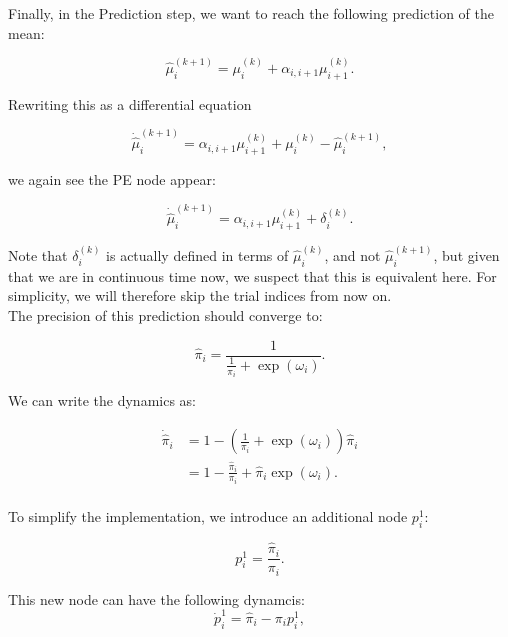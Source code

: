 Finally, in the \textsf{Prediction} step, we want to reach the following prediction of the mean:

\begin{equation}
	\hat{\mu}_i^{(k+1)} = \mu_i^{(k)} + \alpha_{i,i+1} \mu_{i+1}^{(k)}.
\end{equation}

Rewriting this as a differential equation

\begin{equation}
	\dot{\hat{\mu}}_i^{(k+1)} = \alpha_{i,i+1} \mu_{i+1}^{(k)} + \mu_i^{(k)} - \hat{\mu}_i^{(k+1)}, 
\end{equation}

we again see the \textsf{PE} node appear:

\begin{equation}
	\dot{\hat{\mu}}_i^{(k+1)} = \alpha_{i,i+1} \mu_{i+1}^{(k)} + \delta_i^{(k)}. 
\end{equation}

Note that $\delta_i^{(k)}$ is actually defined in terms of $\hat{\mu}_i^{(k)}$, and not $\hat{\mu}_i^{(k+1)}$, but given that we are in continuous time now, we suspect that this is equivalent here. For simplicity, we will therefore skip the trial indices from now on. \\

The precision of this prediction should converge to:

\begin{equation}
	\hat{\pi}_i = \frac{1}{\frac{1}{\pi_i} + \exp(\omega_i)}.
\end{equation}

We can write the dynamics as:

\begin{equation}
	\begin{split}
		\dot{\hat{\pi}}_i &= 1 - (\frac{1}{\pi_i} + \exp(\omega_i)) \hat{\pi}_i\\
		&= 1 - \frac{\hat{\pi}_i}{\pi_i} + \hat{\pi}_i \exp(\omega_i).\\
	\end{split}
\end{equation}

To simplify the implementation, we introduce an additional node $p_i^1$:

\begin{equation}
	p_i^1 = \frac{\hat{\pi}_i}{\pi_i}.
\end{equation}

This new node can have the following dynamcis:
\begin{equation}
	\dot{p}_i^1 = \hat{\pi}_i - \pi_i p_i^1, 
\end{equation}

